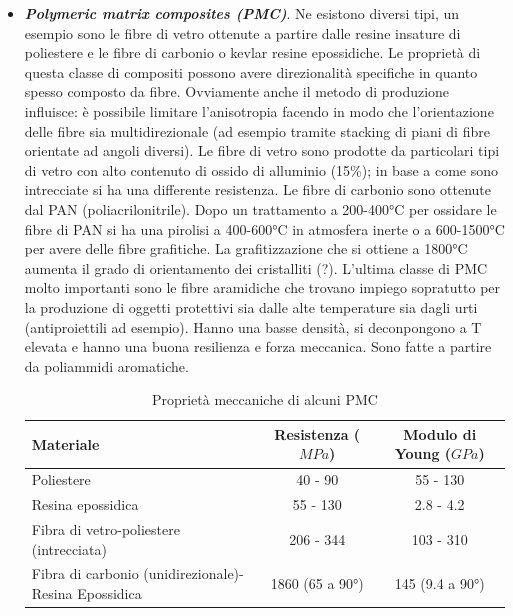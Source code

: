 \documentclass{article}
\begin{document}
\begin{itemize}
\item \textbf{\textit{Polymeric matrix composites (PMC)}}. Ne esistono diversi tipi, un esempio sono le fibre di vetro ottenute a partire dalle resine insature di poliestere e le fibre di carbonio o kevlar resine epossidiche. Le proprietà di questa classe di compositi possono avere direzionalità specifiche in quanto spesso composto da fibre. Ovviamente anche il metodo di produzione influisce: è possibile limitare l'anisotropia facendo in modo che l'orientazione delle fibre sia multidirezionale (ad esempio tramite stacking di piani di fibre orientate ad angoli diversi). Le fibre di vetro sono prodotte da particolari tipi di vetro con alto contenuto di ossido di alluminio (15\%); in base a come sono intrecciate si ha una differente resistenza. Le fibre di carbonio sono ottenute dal PAN (poliacrilonitrile). Dopo un trattamento a 200-400°C per ossidare le fibre di PAN si ha una pirolisi a 400-600°C in atmosfera inerte o a 600-1500°C per avere delle fibre grafitiche. La grafitizzazione che si ottiene a 1800°C aumenta il grado di orientamento dei cristalliti (?). L'ultima classe di PMC molto importanti sono le fibre aramidiche che trovano impiego sopratutto per la produzione di oggetti protettivi sia dalle alte temperature sia dagli urti (antiproiettili ad esempio). Hanno una basse densità, si deconpongono a T elevata e hanno una buona resilienza e forza meccanica. Sono fatte a partire da poliammidi aromatiche. 
 
\begin{table}[h]
\centering
\begin{tabular}{@{}lcc@{}}
\toprule
\textbf{Materiale}  & \textbf{Resistenza ($MPa$)} & \textbf{Modulo di Young ($GPa$)}  \\ \midrule
Poliestere & 40 - 90  & 55 - 130  \\
Resina epossidica & 55 - 130 & 2.8 - 4.2 \\
Fibra di vetro-poliestere (intrecciata) & 206 - 344 & 103 - 310 \\
Fibra di carbonio (unidirezionale)-Resina Epossidica & 1860 (65 a 90°) & 145 (9.4 a 90°) \\ \bottomrule
\end{tabular}
\caption{Proprietà meccaniche di alcuni PMC}
\label{tab:resine}
\end{table}


\end{itemize}
\end{document}

